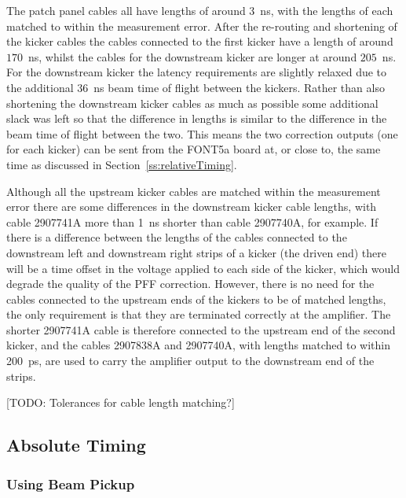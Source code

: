 The patch panel cables all have lengths of around 3~ns, with the lengths of each matched to within the measurement error. After the re-routing and shortening of the kicker cables the cables connected to the first kicker have a length of around \(170\)~ns, whilst the cables for the downstream kicker are longer at around \(205\)~ns. For the downstream kicker the latency requirements are slightly relaxed due to the additional 36~ns beam time of flight between the kickers. Rather than also shortening the downstream kicker cables as much as possible some additional slack was left so that the difference in lengths is similar to the difference in the beam time of flight between the two. This means the two correction outputs (one for each kicker) can be sent from the FONT5a board at, or close to, the same time as discussed in Section~\ref{ss:relativeTiming}.

Although all the upstream kicker cables are matched within the measurement error there are some differences in the downstream kicker cable lengths, with cable 2907741A more than 1~ns shorter than cable 2907740A, for example. If there is a difference between the lengths of the cables connected to the downstream left and downstream right strips of a kicker (the driven end) there will be a time offset in the voltage applied to each side of the kicker, which would degrade the quality of the PFF correction. However, there is no need for the cables connected to the upstream ends of the kickers to be of matched lengths, the only requirement is that they are terminated correctly at the amplifier. The shorter 2907741A cable is therefore connected to the upstream end of the second kicker, and the cables 2907838A and 2907740A, with lengths matched to within 200~ps, are used to carry the amplifier output to the downstream end of the strips.

[TODO: Tolerances for cable length matching?]






\subsection{Absolute Timing}
\label{ss:absTiming}



\subsubsection{Using Beam Pickup}
\label{sss:beamPickup}

